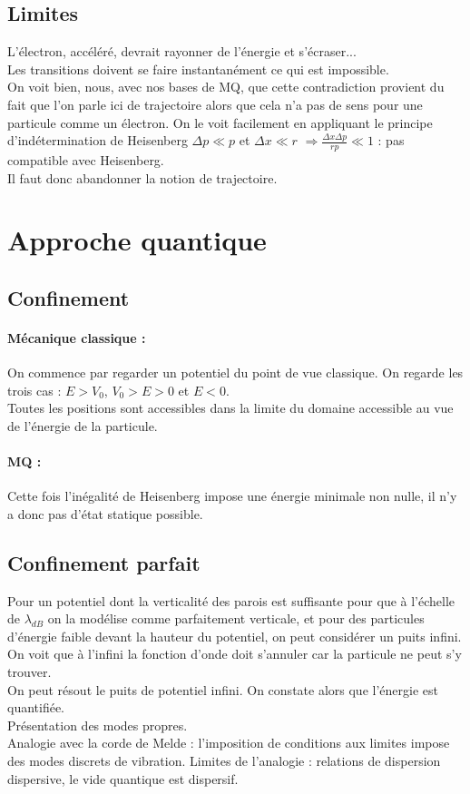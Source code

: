 \documentclass[12pt,prb,aps,epsf]{article}
\begin{document}
\subsection{Limites}
L'électron, accéléré, devrait rayonner de l'énergie et s'écraser...\\
Les transitions doivent se faire instantanément ce qui est impossible.\\
On voit bien, nous, avec nos bases de MQ, que cette contradiction provient du fait que l'on parle ici de trajectoire alors que cela n'a pas de sens pour une particule comme un électron. On le voit facilement en appliquant le principe d'indétermination de Heisenberg
$\Delta p \ll p$ et $\Delta x \ll r$ $\Rightarrow  \frac{\Delta x \Delta p }{r p}\ll 1$ : pas compatible avec Heisenberg.\\
Il faut donc abandonner la notion de trajectoire.

\section{Approche quantique}
\subsection{Confinement}
\paragraph{ Mécanique classique :}
On commence par regarder un potentiel du point de vue classique. On regarde les trois cas : $E>V_0$, $V_0>E>0$ et $E<0$.\\ 
Toutes les positions sont accessibles dans la limite du domaine accessible au vue de l'énergie de la particule.

\paragraph{MQ :} Cette fois l'inégalité de Heisenberg impose une énergie minimale non nulle, il n'y a donc pas d'état statique possible.
\subsection{Confinement parfait}
Pour un potentiel dont la verticalité des parois est suffisante pour que à l'échelle de $\lambda_{dB}$ on la modélise comme parfaitement verticale, et pour des particules d'énergie faible devant la hauteur du potentiel, on peut considérer un puits infini.\\
On voit que à l'infini la fonction d'onde doit s'annuler car la particule ne peut s'y trouver.\\
On peut résout le puits de potentiel infini. On constate alors que l'énergie est quantifiée.\\
Présentation des modes propres.\\
Analogie avec la corde de Melde : l'imposition de conditions aux limites impose des modes discrets de vibration. Limites de l'analogie : relations de dispersion dispersive, le vide quantique est dispersif.\\
\end{document}
